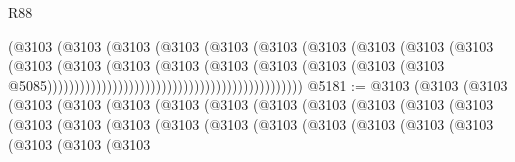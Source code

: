 \begin{lexlean}{R88}
\begin{coremodule}
                                                            (@3103
                                                              (@3103
                                                                (@3103
                                                                  (@3103
                                                                    (@3103
                                                                      (@3103
                                                                        (@3103
                                                                          (@3103
                                                                            (@3103
                                                                              (@3103
                                                                                (@3103
                                                                                  (@3103
                                                                                    (@3103
                                                                                      (@3103
                                                                                        (@3103
                                                                                          (@3103
                                                                                            (@3103
                                                                                              (@3103
                                                                                                (@3103
                                                                                                  @5085)))))))))))))))))))))))))))))))))))))))))))))))
@5181 := @3103
    (@3103
      (@3103
        (@3103
          (@3103
            (@3103
              (@3103
                (@3103
                  (@3103
                    (@3103
                      (@3103
                        (@3103
                          (@3103
                            (@3103
                              (@3103
                                (@3103
                                  (@3103
                                    (@3103
                                      (@3103
                                        (@3103
                                          (@3103
                                            (@3103
                                              (@3103
                                                (@3103
                                                  (@3103
                                                    (@3103

\end{coremodule}
\end{lexlean}

